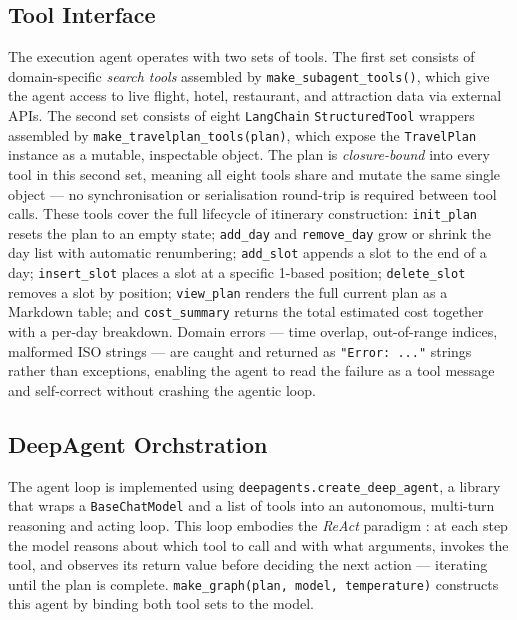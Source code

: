 \documentclass[a4paper,oneside,bibliography=totoc]{scrbook}
\begin{document}
\subsection{Tool Interface}

The execution agent operates with two sets of tools. The first set consists
of domain-specific \emph{search tools} assembled by
\texttt{make\_subagent\_tools()}, which give the agent access to live flight,
hotel, restaurant, and attraction data via external APIs. The second set
consists of eight \texttt{LangChain} \texttt{StructuredTool} wrappers
assembled by \texttt{make\_travelplan\_tools(plan)}, which expose the
\texttt{TravelPlan} instance as a mutable, inspectable object. The plan is
\emph{closure-bound} into every tool in this second set, meaning all eight
tools share and mutate the same single object --- no synchronisation or
serialisation round-trip is required between tool calls. These tools cover
the full lifecycle of itinerary construction:
\texttt{init\_plan} resets the plan to an empty state;
\texttt{add\_day} and \texttt{remove\_day} grow or shrink the day list with
automatic renumbering;
\texttt{add\_slot} appends a slot to the end of a day;
\texttt{insert\_slot} places a slot at a specific 1-based position;
\texttt{delete\_slot} removes a slot by position;
\texttt{view\_plan} renders the full current plan as a Markdown table; and
\texttt{cost\_summary} returns the total estimated cost together with a
per-day breakdown.
Domain errors --- time overlap, out-of-range indices, malformed ISO strings
--- are caught and returned as \texttt{"Error: ..."} strings rather than
exceptions, enabling the agent to read the failure as a tool message and
self-correct without crashing the agentic loop.

\subsection{DeepAgent Orchstration}

The agent loop is implemented using \texttt{deepagents.create\_deep\_agent},
a library that wraps a \texttt{BaseChatModel} and a list of tools into an
autonomous, multi-turn reasoning and acting loop. This loop embodies the
\emph{ReAct} paradigm \cite{yao2023react}: at each step the model reasons
about which tool to call and with what arguments, invokes the tool, and
observes its return value before deciding the next action --- iterating until
the plan is complete. \texttt{make\_graph(plan, model, temperature)} constructs
this agent by binding both tool sets to the model.
\end{document}
